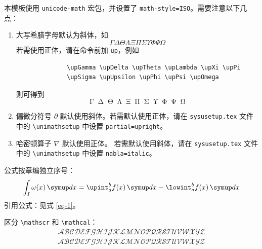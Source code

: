 本模板使用 \verb|unicode-math| 宏包，并设置了 \verb|math-style=ISO|。需要注意以下几点：

\begin{enumerate}
    \item 大写希腊字母默认为斜体，如
          \begin{equation*}
              \Gamma \Delta \Theta \Lambda \Xi \Pi \Sigma \Upsilon \Phi \Psi \Omega
          \end{equation*}
          若需使用正体，请在命令前加 \verb|up|，例如
          \begin{verbatim}
              \upGamma \upDelta \upTheta \upLambda \upXi \upPi
              \upSigma \upUpsilon \upPhi \upPsi \upOmega
          \end{verbatim}
          则可得到
          \begin{equation*}
              \upGamma \upDelta \upTheta \upLambda \upXi \upPi \upSigma \upUpsilon \upPhi \upPsi \upOmega
          \end{equation*}
    \item 偏微分符号 $\partial$ 默认使用斜体。若需默认使用正体，请在 \texttt{sysusetup.tex} 文件中的 \verb|\unimathsetup| 中设置 \verb|partial=upright|。
    \item 哈密顿算子 $\nabla$ 默认使用正体。
          若需默认使用斜体，请在 \texttt{sysusetup.tex} 文件中的 \verb|\unimathsetup| 中设置 \verb|nabla=italic|。
\end{enumerate}

公式按章编独立序号：
\begin{equation} \label{eq-1}
    \int_I \omega(x)\diff x = \upint_{a}^b f(x)\diff x - \lowint_a^b f(x)\diff x
\end{equation}
引用公式：见式 \eqref{eq-1}。

区分 \verb|\mathscr| 和 \verb|\mathcal|：
\begin{gather*}
    \mathscr{A} \mathscr{B} \mathscr{C} \mathscr{D} \mathscr{E} \mathscr{F} \mathscr{G} \mathscr{H} \mathscr{I} \mathscr{J} \mathscr{K} \mathscr{L} \mathscr{M} \mathscr{N} \mathscr{O} \mathscr{P} \mathscr{Q} \mathscr{R} \mathscr{S} \mathscr{T} \mathscr{U} \mathscr{V} \mathscr{W} \mathscr{X} \mathscr{Y} \mathscr{Z}\\
    \mathcal{A} \mathcal{B} \mathcal{C} \mathcal{D} \mathcal{E} \mathcal{F} \mathcal{G} \mathcal{H} \mathcal{I} \mathcal{J} \mathcal{K} \mathcal{L} \mathcal{M} \mathcal{N} \mathcal{O} \mathcal{P} \mathcal{Q} \mathcal{R} \mathcal{S} \mathcal{T} \mathcal{U} \mathcal{V} \mathcal{W} \mathcal{X} \mathcal{Y} \mathcal{Z}
\end{gather*}

